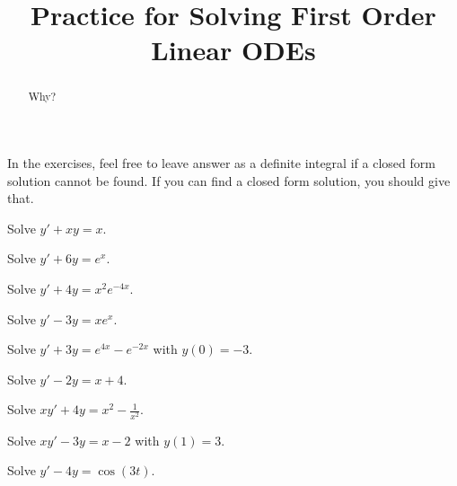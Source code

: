 \documentclass{ximera}
\title{Practice for Solving First Order Linear ODEs}
\begin{document}
\begin{abstract}
    Why?
\end{abstract}
\maketitle


In the exercises, feel free to leave answer as a definite integral if a closed form solution cannot be found.  If you can find a closed form solution, you should give that.

\begin{exercise}
    Solve $y' + xy = x$.
\end{exercise}

\begin{exercise}
    Solve $y' + 6y = e^x$.
\end{exercise}

\begin{exercise}
    Solve $y' + 4y = x^2e^{-4x}$.
\end{exercise}

\begin{exercise}
    Solve $y' - 3y = xe^x$.
\end{exercise}

\begin{exercise}
    Solve $y' + 3y = e^{4x} - e^{-2x}$ with $y(0) = -3$.
\end{exercise}

\begin{exercise}
    Solve $y' - 2y = x + 4$.
\end{exercise}

\begin{exercise}
    Solve $xy' + 4y = x^2 - \frac{1}{x^2}$.
\end{exercise}

\begin{exercise}
    Solve $xy' - 3y = x-2$ with $y(1) = 3$. 
\end{exercise}

\begin{exercise}
    Solve $y' - 4y = \cos{(3t)}$.
\end{exercise}
\end{document}
